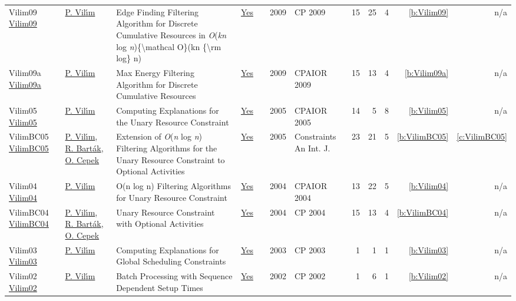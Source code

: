 {\begin{longtable}{>{\raggedright\arraybackslash}p{3cm}>{\raggedright\arraybackslash}p{6cm}>{\raggedright\arraybackslash}p{6.5cm}rrrp{2.5cm}rrrrr}
Vilim09 \href{https://doi.org/10.1007/978-3-642-04244-7_62}{Vilim09} & \hyperref[auth:a121]{P. Vil{\'{\i}}m} & Edge Finding Filtering Algorithm for Discrete Cumulative Resources in \emph{O}(\emph{kn} log \emph{n})\{{\textbackslash}mathcal O\}(kn \{{\textbackslash}rm log\} n) & \href{../works/Vilim09.pdf}{Yes} & \cite{Vilim09} & 2009 & CP 2009 & 15 & 25 & 4 & \ref{b:Vilim09} & n/a\\
Vilim09a \href{https://doi.org/10.1007/978-3-642-01929-6_22}{Vilim09a} & \hyperref[auth:a121]{P. Vil{\'{\i}}m} & Max Energy Filtering Algorithm for Discrete Cumulative Resources & \href{../works/Vilim09a.pdf}{Yes} & \cite{Vilim09a} & 2009 & CPAIOR 2009 & 15 & 13 & 4 & \ref{b:Vilim09a} & n/a\\
Vilim05 \href{https://doi.org/10.1007/11493853_29}{Vilim05} & \hyperref[auth:a121]{P. Vil{\'{\i}}m} & Computing Explanations for the Unary Resource Constraint & \href{../works/Vilim05.pdf}{Yes} & \cite{Vilim05} & 2005 & CPAIOR 2005 & 14 & 5 & 8 & \ref{b:Vilim05} & n/a\\
VilimBC05 \href{https://doi.org/10.1007/s10601-005-2814-0}{VilimBC05} & \hyperref[auth:a121]{P. Vil{\'{\i}}m}, \hyperref[auth:a153]{R. Bart{\'{a}}k}, \hyperref[auth:a162]{O. Cepek} & Extension of \emph{O}(\emph{n} log \emph{n}) Filtering Algorithms for the Unary Resource Constraint to Optional Activities & \href{../works/VilimBC05.pdf}{Yes} & \cite{VilimBC05} & 2005 & Constraints An Int. J. & 23 & 21 & 5 & \ref{b:VilimBC05} & \ref{c:VilimBC05}\\
Vilim04 \href{https://doi.org/10.1007/978-3-540-24664-0_23}{Vilim04} & \hyperref[auth:a121]{P. Vil{\'{\i}}m} & O(n log n) Filtering Algorithms for Unary Resource Constraint & \href{../works/Vilim04.pdf}{Yes} & \cite{Vilim04} & 2004 & CPAIOR 2004 & 13 & 22 & 5 & \ref{b:Vilim04} & n/a\\
VilimBC04 \href{https://doi.org/10.1007/978-3-540-30201-8_8}{VilimBC04} & \hyperref[auth:a121]{P. Vil{\'{\i}}m}, \hyperref[auth:a153]{R. Bart{\'{a}}k}, \hyperref[auth:a162]{O. Cepek} & Unary Resource Constraint with Optional Activities & \href{../works/VilimBC04.pdf}{Yes} & \cite{VilimBC04} & 2004 & CP 2004 & 15 & 13 & 4 & \ref{b:VilimBC04} & n/a\\
Vilim03 \href{https://doi.org/10.1007/978-3-540-45193-8_124}{Vilim03} & \hyperref[auth:a121]{P. Vil{\'{\i}}m} & Computing Explanations for Global Scheduling Constraints & \href{../works/Vilim03.pdf}{Yes} & \cite{Vilim03} & 2003 & CP 2003 & 1 & 1 & 1 & \ref{b:Vilim03} & n/a\\
Vilim02 \href{https://doi.org/10.1007/3-540-46135-3_62}{Vilim02} & \hyperref[auth:a121]{P. Vil{\'{\i}}m} & Batch Processing with Sequence Dependent Setup Times & \href{../works/Vilim02.pdf}{Yes} & \cite{Vilim02} & 2002 & CP 2002 & 1 & 6 & 1 & \ref{b:Vilim02} & n/a\\
\end{longtable}
}

